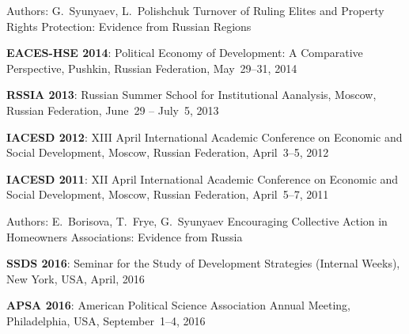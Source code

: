 \begin{cventries}
  \cventry
    {Authors: G.~Syunyaev, L.~Polishchuk} %
    {Turnover of Ruling Elites and Property Rights Protection: Evidence from Russian Regions} %
    {} %
    {} %
    {
      \begin{cvitems} %
        \item {\textbf{EACES-HSE 2014}: Political Economy of Development: A Comparative Perspective, Pushkin, Russian Federation, May~29--31, 2014}
        \item {\textbf{RSSIA 2013}: Russian Summer School for Institutional Aanalysis, Moscow, Russian Federation, June~29 -- July~5, 2013}
        \item {\textbf{IACESD 2012}: XIII April International Academic Conference on Economic and Social Development, Moscow, Russian Federation, April~3--5, 2012}
        \item {\textbf{IACESD 2011}: XII April International Academic Conference on Economic and Social Development, Moscow, Russian Federation, April~5--7, 2011}
      \end{cvitems}
    }

  \cventry
    {Authors: E.~Borisova, T.~Frye, G.~Syunyaev} %
    {Encouraging Collective Action in Homeowners Associations: Evidence from Russia} %
    {} %
    {} %
    {
      \begin{cvitems} %
        \item {\textbf{SSDS 2016}: Seminar for the Study of Development Strategies (Internal Weeks), New York, USA, April, 2016}
        \item {\textbf{APSA 2016}: American Political Science Association Annual Meeting, Philadelphia, USA, September~1--4, 2016}
      \end{cvitems}
    }

\end{cventries}

